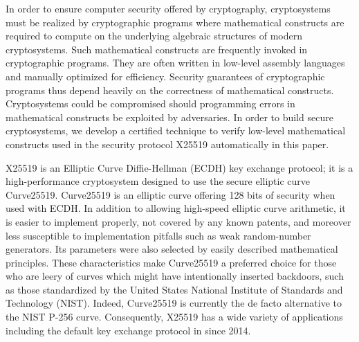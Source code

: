 
In order to ensure computer security offered by cryptography,
cryptosystems must be realized by cryptographic programs where mathematical
constructs are required to compute on the underlying algebraic
structures of modern cryptosystems.
Such mathematical constructs are frequently invoked in cryptographic
programs. They are often written in low-level assembly languages and
manually optimized for efficiency. 
Security guarantees of cryptographic programs
thus depend heavily on the correctness of mathematical constructs.
Cryptosystems could be compromised should programming
errors in mathematical constructs be exploited by adversaries.
In order to build secure cryptosystems, we develop a certified
technique to verify low-level mathematical constructs used in the
security protocol X25519 automatically in this paper.

X25519 is an Elliptic Curve Diffie-Hellman (ECDH) key exchange
protocol; it is a high-performance cryptosystem designed to 
use the secure elliptic curve Curve25519. Curve25519 is an elliptic
curve offering 128 bits of security when used with ECDH. In addition
to allowing high-speed elliptic curve arithmetic, it is easier to
implement properly, not covered by any known patents, and moreover
less susceptible to implementation pitfalls such as weak 
random-number generators. Its parameters were also selected by
easily described mathematical principles.
These characteristics make Curve25519 a
preferred choice for those who are leery of curves which might have
intentionally inserted
backdoors, such as those standardized by the United States National
Institute of Standards and Technology (NIST). 
Indeed, Curve25519 is currently the
de facto alternative to the NIST P-256 curve. Consequently, X25519 has
a wide variety of applications including the default key exchange
protocol in \openssh since 2014.

